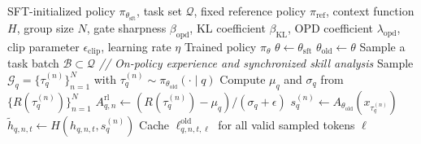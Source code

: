 \begin{algorithm}[t]
\caption{\textsc{Seed}: Self-Evolving On-Policy Distillation}
\label{alg:seed}
\footnotesize
\begin{algorithmic}[1]
\Require SFT-initialized policy $\pi_{\theta_{\mathrm{sft}}}$, task set $\mathcal{Q}$,
fixed reference policy $\pi_{\mathrm{ref}}$, context function $H$, group size $N$,
gate sharpness $\beta_{\mathrm{opd}}$, KL coefficient $\beta_{\mathrm{KL}}$,
OPD coefficient $\lambda_{\mathrm{opd}}$, clip parameter $\epsilon_{\mathrm{clip}}$,
learning rate $\eta$
\Ensure Trained policy $\pi_\theta$
\State $\theta \gets \theta_{\mathrm{sft}}$
    \State $\theta_{\mathrm{old}} \gets \theta$
    \State Sample a task batch $\mathcal{B} \subset \mathcal{Q}$
    \State \textcolor{green!50!black}{\textit{// On-policy experience and synchronized skill analysis}}
        \State Sample $\mathcal{G}_q=\{\tau_q^{(n)}\}_{n=1}^{N}$ with
        $\tau_q^{(n)}\sim\pi_{\theta_{\mathrm{old}}}(\cdot\mid q)$
        \State Compute $\mu_q$ and $\sigma_q$ from
        $\{R(\tau_q^{(n)})\}_{n=1}^{N}$
            \State $A^{\mathrm{rl}}_{q,n}\gets
            (R(\tau_q^{(n)})-\mu_q)/(\sigma_q+\epsilon)$
            \State $s_q^{(n)}\gets
            A_{\theta_{\mathrm{old}}}(x_{\tau_q^{(n)}})$
                \State $\tilde h_{q,n,t}\gets
                H(h_{q,n,t},s_q^{(n)})$
                \State Cache $\ell^{\mathrm{old}}_{q,n,t,\ell}$ for all
                valid sampled tokens $\ell$
            \EndFor
        \EndFor
    \EndFor
    

\end{algorithmic}
\end{algorithm}
